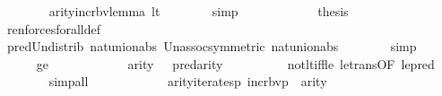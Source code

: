 \begin{isabellebody}
\ \ \ \ \ \ \isamarkupfalse%
\ arity{\isacharunderscore}{\kern0pt}incr{\isacharunderscore}{\kern0pt}bv{\isacharunderscore}{\kern0pt}lemma\ lt\isanewline
\ \ \ \ \ \ \isamarkupfalse%
\ simp\isanewline
\ \ \ \ \isamarkupfalse%
\ {\isacartoucheopen}{\isasymphi}{\isasymin}{\isacharunderscore}{\kern0pt}{\isacartoucheclose}\isanewline
\ \ \ \ \isamarkupfalse%
\ {\isacharquery}{\kern0pt}thesis\isanewline
\ \ \ \ \ \ \isamarkupfalse%
\ ren{\isacharunderscore}{\kern0pt}forces{\isacharunderscore}{\kern0pt}forall{\isacharunderscore}{\kern0pt}def\isanewline
\ \ \ \ \ \ \isamarkupfalse%
\ pred{\isacharunderscore}{\kern0pt}Un{\isacharunderscore}{\kern0pt}distrib\ nat{\isacharunderscore}{\kern0pt}union{\isacharunderscore}{\kern0pt}abs{}\ Un{\isacharunderscore}{\kern0pt}assoc{\isacharbrackleft}{\kern0pt}symmetric{\isacharbrackright}{\kern0pt}\ nat{\isacharunderscore}{\kern0pt}union{\isacharunderscore}{\kern0pt}abs{}\isanewline
\ \ \ \ \ \ \isamarkupfalse%
\ simp\isanewline
\ \ \isamarkupfalse%
\isanewline
\ \ \ \ \isamarkupfalse%
\ ge\isanewline
\ \ \ \ \isamarkupfalse%
\ {\isacartoucheopen}{\isasymphi}{\isasymin}{\isacharunderscore}{\kern0pt}{\isacartoucheclose}\isanewline
\ \ \ \ \isamarkupfalse%
\ {\isachardoublequoteopen}arity{\isacharparenleft}{\kern0pt}{\isasymphi}{\isacharparenright}{\kern0pt}\ {\isasymle}\ {}{\isachardoublequoteclose}\ {\isachardoublequoteopen}pred{\isacharcircum}{\kern0pt}{}{\isacharparenleft}{\kern0pt}arity{\isacharparenleft}{\kern0pt}{\isasymphi}{\isacharparenright}{\kern0pt}{\isacharparenright}{\kern0pt}\ {\isasymle}\ {}{\isachardoublequoteclose}\isanewline
\ \ \ \ \ \ \isamarkupfalse%
\ not{\isacharunderscore}{\kern0pt}lt{\isacharunderscore}{\kern0pt}iff{\isacharunderscore}{\kern0pt}le\ le{\isacharunderscore}{\kern0pt}trans{\isacharbrackleft}{\kern0pt}OF\ le{\isacharunderscore}{\kern0pt}pred{\isacharbrackright}{\kern0pt}\isanewline
\ \ \ \ \ \ \isamarkupfalse%
\ simp{\isacharunderscore}{\kern0pt}all\isanewline
\ \ \ \ \isamarkupfalse%
\ {\isacartoucheopen}{\isasymphi}{\isasymin}{\isacharunderscore}{\kern0pt}{\isacartoucheclose}\isanewline
\ \ \ \ \isamarkupfalse%
\ {\isachardoublequoteopen}arity{\isacharparenleft}{\kern0pt}iterates{\isacharparenleft}{\kern0pt}{\isasymlambda}p{\isachardot}{\kern0pt}\ incr{\isacharunderscore}{\kern0pt}bv{\isacharparenleft}{\kern0pt}p{\isacharparenright}{\kern0pt}{\isacharbackquote}{\kern0pt}{}{\isacharcomma}{\kern0pt}{}{\isacharcomma}{\kern0pt}{\isasymphi}{\isacharparenright}{\kern0pt}{\isacharparenright}{\kern0pt}\ {\isacharequal}{\kern0pt}\ arity{\isacharparenleft}{\kern0pt}{\isasymphi}{\isacharparenright}{\kern0pt}{\isachardoublequoteclose}\isanewline

\end{isabellebody}
